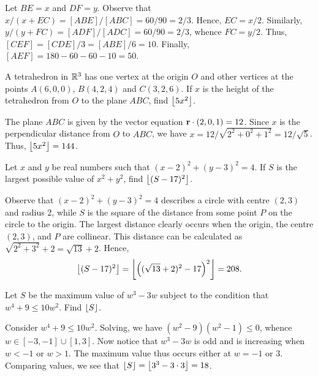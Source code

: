 Let $BE = x$ and $DF = y$. Observe that $x/(x+EC) = [ABE]/[ABC] = 60/90 = 2/3$. Hence, $EC = x/2$. Similarly, $y/(y+FC) = [ADF]/[ADC] = 60/90 = 2/3$, whence $FC = y/2$. Thus, $[CEF] = [CDE]/3 = [ABE]/6 = 10$. Finally, $[AEF] = 180 - 60 - 60 - 10 = 50$.

\clearpage
\begin{question}[144]\label{A::2022-O-1-7}
    A tetrahedron in $\mathbb{R}^3$ has one vertex at the origin $O$ and other vertices at the points $A(6, 0, 0)$, $B(4, 2, 4)$ and $C(3, 2, 6)$. If $x$ is the height of the tetrahedron from $O$ to the plane $ABC$, find $\left\lfloor 5x^2 \right\rfloor$.
\end{question}

The plane $ABC$ is given by the vector equation $\mathbf{r} \cdot (2, 0, 1) = 12$. Since $x$ is the perpendicular distance from $O$ to $ABC$, we have $x = 12/{\sqrt{2^2 + 0^2 + 1^2}} = 12/\sqrt5$. Thus, $\left\lfloor 5x^2 \right\rfloor = 144$.

\begin{question}[208]\label{A::2022-O-1-8}
    Let $x$ and $y$ be real numbers such that $(x-2)^2 + (y-3)^2 = 4$. If $S$ is the largest possible value of $x^2 + y^2$, find $\left\lfloor (S-17)^2 \right\rfloor$.
\end{question}

Observe that $(x-2)^2 + (y-3)^2 = 4$ describes a circle with centre $(2, 3)$ and radius 2, while $S$ is the square of the distance from some point $P$ on the circle to the origin. The largest distance clearly occurs when the origin, the centre $(2, 3)$, and $P$ are collinear. This distance can be calculated as $\sqrt{2^2 + 3^2} + 2 = \sqrt{13} + 2$. Hence, \[\left\lfloor (S-17)^2 \right\rfloor = \left\lfloor \left( (\sqrt{13} + 2)^2 - 17 \right)^2 \right\rfloor = 208.\]

\begin{question}[18]\label{A::2022-O-1-9}
    Let $S$ be the maximum value of $w^3 - 3w$ subject to the condition that $w^4 + 9 \leq 10w^2$. Find $\left\lfloor S \right\rfloor$.
\end{question}

Consider $w^4 + 9 \leq 10 w^2$. Solving, we have $(w^2 - 9)(w^2 - 1) \leq 0$, whence $w \in [-3, -1] \cup [1, 3]$. Now notice that $w^3 - 3w$ is odd and is increasing when $w < -1$ or $w > 1$. The maximum value thus occurs either at $w = -1$ or $3$. Comparing values, we see that $\left\lfloor S \right\rfloor = \left\lfloor 3^3 - 3\cdot3 \right\rfloor = 18$.

